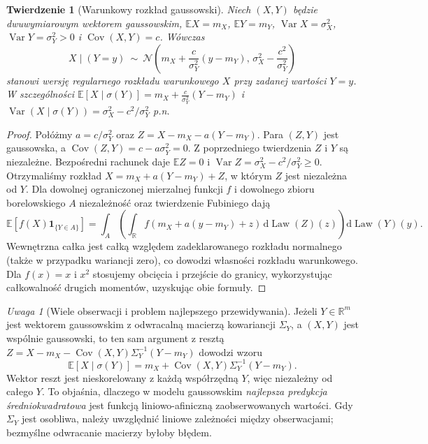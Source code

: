 \documentclass[11pt,a4paper,oneside]{report}
\numberwithin{equation}{chapter}
\theoremstyle{plain}
\newtheorem{twierdzenie}{Twierdzenie}[chapter]
\theoremstyle{definition}
\theoremstyle{remark}
\newtheorem{uwaga}{Uwaga}[chapter]
\newcommand{\R}{\mathbb{R}}
\newcommand{\E}{\mathbb{E}}
\newcommand{\Var}{\operatorname{Var}}
\newcommand{\Cov}{\operatorname{Cov}}
\newcommand{\Law}{\operatorname{Law}}
\newcommand{\ind}[1]{\mathbf{1}_{#1}}
\newcommand{\dd}{\mathrm{d}}
\newcommand{\Normal}{\mathcal{N}}
\begin{document}
\begin{twierdzenie}[Warunkowy rozkład gaussowski]
Niech $(X,Y)$ będzie dwuwymiarowym wektorem gaussowskim,
$\E X=m_X$, $\E Y=m_Y$, $\Var X=\sigma_X^2$,
$\Var Y=\sigma_Y^2>0$ i $\Cov(X,Y)=c$.
Wówczas
\[
X\mid(Y=y)\ \sim\ \Normal\left(
 m_X+\frac{c}{\sigma_Y^2}(y-m_Y),\,
 \sigma_X^2-\frac{c^2}{\sigma_Y^2}\right)
\]
stanowi wersję regularnego rozkładu warunkowego $X$ przy zadanej
wartości $Y=y$. W szczególności
$\E[X\mid\sigma(Y)]=m_X+\frac{c}{\sigma_Y^2}(Y-m_Y)$
i $\Var(X\mid\sigma(Y))=\sigma_X^2-c^2/\sigma_Y^2$ p.n.
\end{twierdzenie}
\begin{proof}
Połóżmy $a=c/\sigma_Y^2$ oraz
$Z=X-m_X-a(Y-m_Y)$. Para $(Z,Y)$ jest gaussowska,
a $\Cov(Z,Y)=c-a\sigma_Y^2=0$.
Z poprzedniego twierdzenia $Z$ i $Y$ są niezależne.
Bezpośredni rachunek daje $\E Z=0$ i
$\Var Z=\sigma_X^2-c^2/\sigma_Y^2\ge0$.
Otrzymaliśmy rozkład $X=m_X+a(Y-m_Y)+Z$,
w którym $Z$ jest niezależna od $Y$.
Dla dowolnej ograniczonej mierzalnej funkcji $f$ i dowolnego
zbioru borelowskiego $A$ niezależność oraz twierdzenie Fubiniego
dają
\[
\E[f(X)\ind{\{Y\in A\}}]
=\int_A\left(\int_\R f(m_X+a(y-m_Y)+z)\,\dd\Law(Z)(z)\right)
\dd\Law(Y)(y).
\]
Wewnętrzna całka jest całką względem zadeklarowanego rozkładu
normalnego (także w przypadku wariancji zero), co dowodzi
własności rozkładu warunkowego. Dla $f(x)=x$ i $x^2$
stosujemy obcięcia i przejście do granicy, wykorzystując
całkowalność drugich momentów, uzyskując obie formuły.
\end{proof}

\begin{uwaga}[Wiele obserwacji i problem najlepszego przewidywania]
Jeżeli $Y\in\R^m$ jest wektorem gaussowskim z odwracalną macierzą
kowariancji $\Sigma_Y$, a $(X,Y)$ jest wspólnie gaussowski,
to ten sam argument z resztą
$Z=X-m_X-\Cov(X,Y)\Sigma_Y^{-1}(Y-m_Y)$ dowodzi wzoru
\[
\E[X\mid\sigma(Y)]
=m_X+\Cov(X,Y)\Sigma_Y^{-1}(Y-m_Y).
\]
Wektor reszt jest nieskorelowany z każdą współrzędną $Y$,
więc niezależny od całego $Y$. To objaśnia, dlaczego
w modelu gaussowskim \emph{najlepsza predykcja średniokwadratowa}
jest funkcją liniowo-afiniczną zaobserwowanych wartości.
Gdy $\Sigma_Y$ jest osobliwa, należy uwzględnić liniowe
zależności między obserwacjami; bezmyślne odwracanie macierzy
byłoby błędem.
\end{uwaga}
\end{document}
